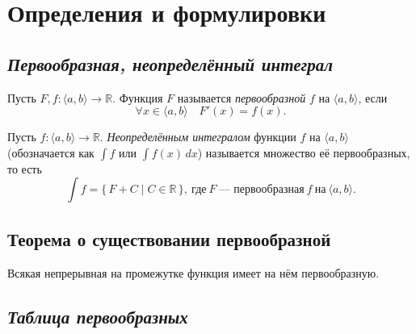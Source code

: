 \section{Определения и формулировки}

\subsection{\itshape Первообразная, неопределённый интеграл}

\begin{ndefinition}
	Пусть $F, f \colon \langle a, b \rangle \to \mathbb{R}$.
	Функция $F$ называется \textit{первообразной} $f$ на $\langle a, b \rangle$, если \[
	\forall x \in \langle a, b \rangle \quad F'(x) = f(x).
	\]
\end{ndefinition}

\begin{ndefinition}
	Пусть $f \colon \langle a, b \rangle \to \mathbb{R}$.
	\textit{Неопределённым интегралом} функции $f$ на $\langle a, b \rangle$
	(обозначается как $\int f$ или $\int f(x) \, dx$) называется множество её первообразных,
	то есть \[
	\int f = \{ \, F + C \mid C \in \mathbb{R} \, \}, \ \text{где} \ F \ \text{--- первообразная} \ f \ \text{на} \ \langle a, b \rangle.
	\]
\end{ndefinition}

\subsection{Теорема о существовании первообразной}

\begin{theorem}
	Всякая непрерывная на промежутке функция имеет на нём первообразную.
\end{theorem}

\subsection{\itshape Таблица первообразных}

